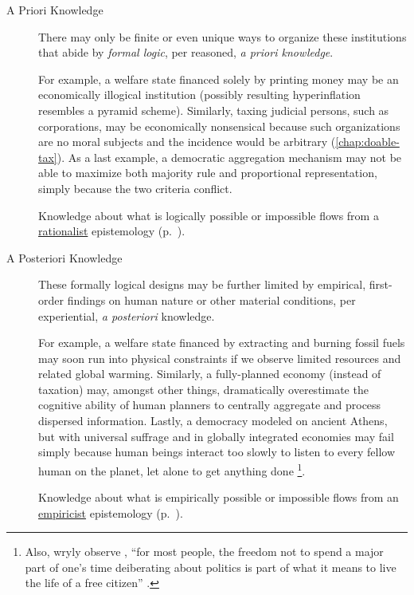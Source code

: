 \begin{description}
	\item[A Priori Knowledge  \label{itm:a-priori}] 
	There may only be finite or even unique ways to organize these institutions that abide by \emph{formal logic}, per reasoned, \emph{a priori knowledge}. 
	
	For example, a welfare state financed solely by printing money may be an economically illogical institution (possibly resulting hyperinflation resembles a pyramid scheme). 
	Similarly, taxing judicial persons, such as corporations, may be economically nonsensical because such organizations are no moral subjects and the incidence would be arbitrary (\autoref{chap:doable-tax}). %
	As a last example, a democratic aggregation mechanism may not be able to maximize both majority rule and proportional representation, simply because the two criteria conflict. 
	
	Knowledge about what is logically possible or impossible flows from a \hyperref[itm:rationalism]{rationalist} epistemology (p.~\pageref{itm:rationalism}).
	
	\item[A Posteriori Knowledge  \label{itm:a-posteriori}] 
	These formally logical designs may be further limited by empirical, first-order findings on human nature or other material conditions, per experiential, \emph{a posteriori} knowledge. 
	
	For example, a welfare state financed by extracting and burning fossil fuels may soon run into physical constraints if we observe limited resources and related global warming. 
	Similarly, a fully-planned economy (instead of taxation) may, amongst other things, dramatically overestimate the cognitive ability of human planners to centrally aggregate and process dispersed information. 
	Lastly, a democracy modeled on ancient Athens, but with universal suffrage and in globally integrated economies may fail simply because human beings interact too slowly to listen to every fellow human on the planet, let alone to get anything done
	\footnote{
		Also, wryly observe \citeauthor{GutmannThompson-2004-aa}, ``for most people, the freedom not to spend a major part of one's time deiberating about politics is part of what it means to live the life of a free citizen'' \citeyearpar[30]{GutmannThompson-2004-aa}.
	}.
	
	Knowledge about what is empirically possible or impossible flows from an \hyperref[itm:empiricism]{empiricist} epistemology (p.~\pageref{itm:empiricism}). 
\end{description}

